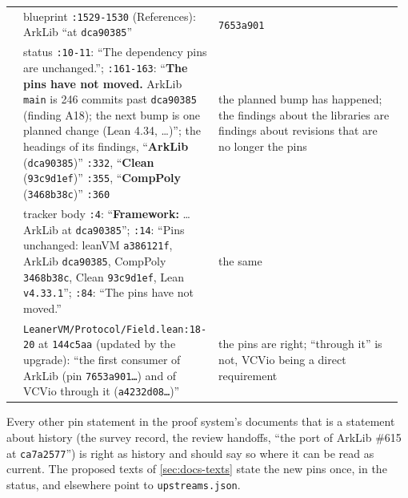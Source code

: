 {\begin{longtable}{@{}>{\raggedright\arraybackslash}p{0.029\linewidth}>{\raggedright\arraybackslash}p{0.470\linewidth}>{\raggedright\arraybackslash}p{0.470\linewidth}@{}}
6 & blueprint \texttt{:\allowbreak{}1529-\allowbreak{}1530} (References): ArkLib ``at \texttt{dca90385}'' & \texttt{7653a901} \\\addlinespace[2pt]
7 & status \texttt{:\allowbreak{}10-\allowbreak{}11}: ``The dependency pins are unchanged.''; \texttt{:\allowbreak{}161-\allowbreak{}163}: ``\textbf{The pins have not moved.} ArkLib \texttt{main} is 246 commits past \texttt{dca90385} (finding A18); the next bump is one planned change (Lean 4.34, …)''; the headings of its findings, ``\textbf{ArkLib} (\texttt{dca90385})'' \texttt{:\allowbreak{}332}, ``\textbf{Clean} (\texttt{93c9d1ef})'' \texttt{:\allowbreak{}355}, ``\textbf{CompPoly} (\texttt{3468b38c})'' \texttt{:\allowbreak{}360} & the planned bump has happened; the findings about the libraries are findings about revisions that are no longer the pins \\\addlinespace[2pt]
8 & tracker body \texttt{:\allowbreak{}4}: ``\textbf{Framework:} … ArkLib at \texttt{dca90385}''; \texttt{:\allowbreak{}14}: ``Pins unchanged: leanVM \texttt{a386121f}, ArkLib \texttt{dca90385}, CompPoly \texttt{3468b38c}, Clean \texttt{93c9d1ef}, Lean \texttt{v4.\allowbreak{}33.\allowbreak{}1}''; \texttt{:\allowbreak{}84}: ``The pins have not moved.'' & the same \\\addlinespace[2pt]
9 & \texttt{Leaner\allowbreak{}VM/\allowbreak{}Protocol/\allowbreak{}Field.\allowbreak{}lean:\allowbreak{}18-\allowbreak{}20} at \texttt{144c5aa} (updated by the upgrade): ``the first consumer of ArkLib (pin \texttt{7653a901…}) and of VCVio through it (\texttt{a4232d08…})'' & the pins are right; ``through it'' is not, VCVio being a direct requirement \\
\end{longtable}}

\begin{sloppypar}
Every other pin statement in the proof system's documents that is a statement about history (the survey record, the review handoffs, ``the port of ArkLib \#615 at \texttt{ca7a2577}'') is right as history and should say so where it can be read as current. The proposed texts of \cref{sec:docs-texts} state the new pins once, in the status, and elsewhere point to \texttt{upstreams.\allowbreak{}json}.
\end{sloppypar}
